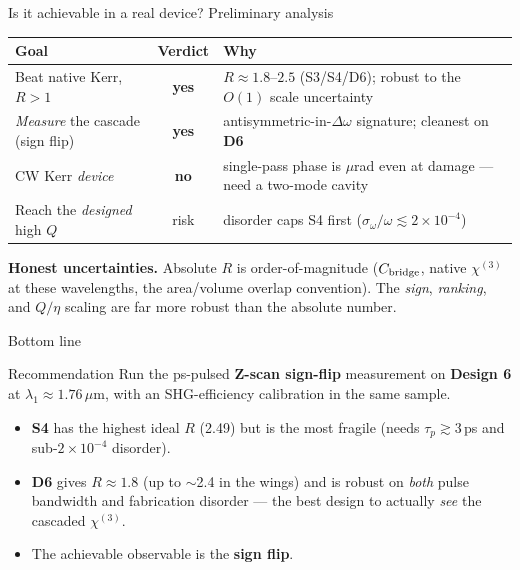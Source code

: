 \documentclass[aspectratio=169,11pt]{beamer}
\newcommand{\chithree}{\chi^{(3)}}
\newcommand{\chinat}{\chi^{(3)}_{\mathrm{native}}}
\newcommand{\Dom}{\Delta\omega}
\newcommand{\yes}{\textcolor{good}{\textbf{yes}}}
\newcommand{\no}{\textcolor{bad}{\textbf{no}}}
\begin{document}
\begin{frame}{Is it achievable in a real device? Preliminary analysis}
  \footnotesize
  \begin{table}
  \centering
  \begin{tabular}{@{}l c p{6.4cm}@{}}
    \toprule
    Goal & Verdict & Why \\
    \midrule
    Beat native Kerr, $R>1$ & \yes & $R\approx1.8$--$2.5$ (S3/S4/D6); robust to the $O(1)$ scale uncertainty \\
    \emph{Measure} the cascade (sign flip) & \yes & antisymmetric-in-$\Dom$ signature; cleanest on \textcolor{d6}{\textbf{D6}} \\
    CW Kerr \emph{device} & \no & single-pass phase is $\mu$rad even at damage --- need a two-mode cavity \\
    Reach the \emph{designed} high $Q$ & \alert{risk} & disorder caps S4 first ($\sigma_\omega/\omega\!\lesssim\!2\times10^{-4}$) \\
    \bottomrule
  \end{tabular}
  \end{table}
  \vspace{2pt}
  \textbf{Honest uncertainties.} Absolute $R$ is order-of-magnitude ($C_{\rm bridge}$, native
  $\chithree$ at these wavelengths, the area/volume overlap convention). The \emph{sign},
  \emph{ranking}, and $Q/\eta$ scaling are far more robust than the absolute number.
\end{frame}

\begin{frame}{Bottom line}
  \begin{alertblock}{Recommendation}
    Run the ps-pulsed \textbf{Z-scan sign-flip} measurement on \textcolor{d6}{\textbf{Design 6}}
    at $\lambda_1\!\approx\!1.76\,\mu$m, with an SHG-efficiency calibration in the same sample.
  \end{alertblock}
  \begin{itemize}\setlength\itemsep{2pt}
    \item \textbf{S4} has the highest ideal $R$ (2.49) but is the most fragile
          (needs $\tau_p\!\gtrsim\!3$\,ps and sub-$2\times10^{-4}$ disorder).
    \item \textcolor{d6}{\textbf{D6}} gives $R\approx1.8$ (up to $\sim$2.4 in the wings) and is
          robust on \emph{both} pulse bandwidth and fabrication disorder --- the best
          design to actually \emph{see} the cascaded $\chithree$.
    \item The achievable observable is the \textbf{sign flip}.
  \end{itemize}
  \vspace{2pt}
\end{frame}
\end{document}
